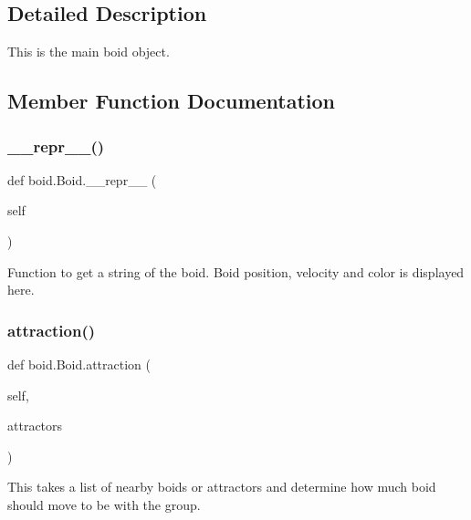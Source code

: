 \subsection{Detailed Description}
\begin{DoxyVerb}This is the main boid object.\end{DoxyVerb}
 

\subsection{Member Function Documentation}
\mbox{\label{classboid_1_1Boid_ab119eb2dfe1a5b2843929992af496051}} 
\subsubsection{\texorpdfstring{\+\_\+\+\_\+repr\+\_\+\+\_\+()}{\_\_repr\_\_()}}
{\footnotesize\ttfamily def boid.\+Boid.\+\_\+\+\_\+repr\+\_\+\+\_\+ (\begin{DoxyParamCaption}\item[{}]{self }\end{DoxyParamCaption})}

\begin{DoxyVerb}Function to get a string of the boid. Boid position, velocity and color is displayed here.\end{DoxyVerb}
 \mbox{\label{classboid_1_1Boid_a6e4936558af1adad15340cf6ad4be290}} 
\subsubsection{\texorpdfstring{attraction()}{attraction()}}
{\footnotesize\ttfamily def boid.\+Boid.\+attraction (\begin{DoxyParamCaption}\item[{}]{self,  }\item[{}]{attractors }\end{DoxyParamCaption})}

\begin{DoxyVerb}This takes a list of nearby boids or attractors and determine how much boid should move to be with the group.\end{DoxyVerb}
 \mbox{\label{classboid_1_1Boid_af194aa87a6828aa7582431fdf074627b}} 
